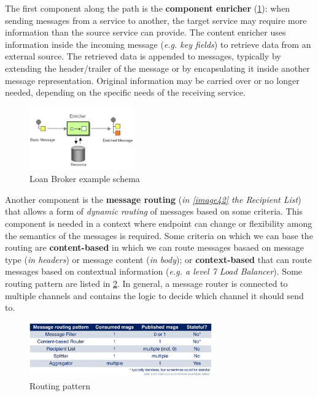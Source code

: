 \documentclass[10pt,a4paper]{report}
\begin{document}
The first component along the path is the \textbf{component enricher} (\ref{image43}): when sending messages from a service to another, the target service may require more information than the source service can provide. The content enricher uses information inside the incoming message (\textit{e.g. key fields}) to retrieve data from an external source. The retrieved data is appended to messages, typically by extending the header/trailer of the message or by encapsulating it inside another message representation. Original information may be carried over or no longer needed, depending on the specific needs of the receiving service.
  \begin{figure}[h]
	\centering
	\includegraphics[width=0.4\textwidth]{image43}
	\caption{Loan Broker example schema}
	\label{image43}
\end{figure}
Another component is the \textbf{message routing} (\textit{in \ref{image42} the Recipient List}) that allows a form of \textit{dynamic routing} of messages based on some criteria. This component is needed in a context where endpoint can change or flexibility among the semantics of the messages is required. Some criteria on which we can base the routing are \textbf{content-based} in which we can route messages basaed on message type (\textit{in headers}) or message content (\textit{in body}); or \textbf{context-based} that can route messages based on contextual information (\textit{e.g. a level 7 Load Balancer}). Some routing pattern are listed in \ref{image44}.
In general, a message router is connected to multiple channels and contains the logic to decide which channel it should send to.
  \begin{figure}[h]
	\centering
	\includegraphics[width=0.7\textwidth]{image44}
	\caption{Routing pattern}
	\label{image44}
\end{figure}
\end{document}
